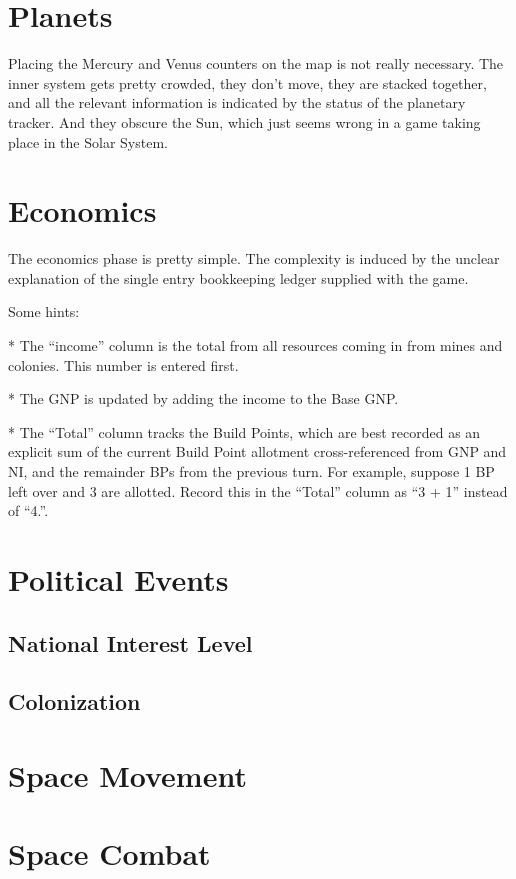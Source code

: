 \documentclass[10pt]{article}
\begin{document}
\begin{multicols}{2}
\section{Planets}

Placing the Mercury and Venus counters on the map is not really necessary.
The inner system gets pretty crowded, they don't move, they are stacked
together, and all the relevant information is indicated by the status of
the planetary tracker. And they obscure the Sun, which just seems wrong
in a game taking place in the Solar System.

\section{Economics}


The economics phase is pretty simple. The complexity is induced
by the unclear explanation of the single entry bookkeeping ledger
supplied with the game.

Some hints:

* The ``income'' column is the total from all resources coming in from mines
and colonies. This number is entered first.

* The GNP is updated by adding the income to the Base GNP.

* The ``Total'' column tracks the Build Points, which are best recorded
as an explicit sum of the current Build Point allotment cross-referenced
from GNP and NI, and the remainder BPs from the previous turn. For example,
suppose 1 BP left over and 3 are allotted. Record this in the ``Total'' column
as ``3 + 1'' instead of ``4.''.

\section{Political Events}
\subsection{National Interest Level}
\subsection{Colonization}

\section{Space Movement}

\section{Space Combat}


\end{multicols}
\end{document}
